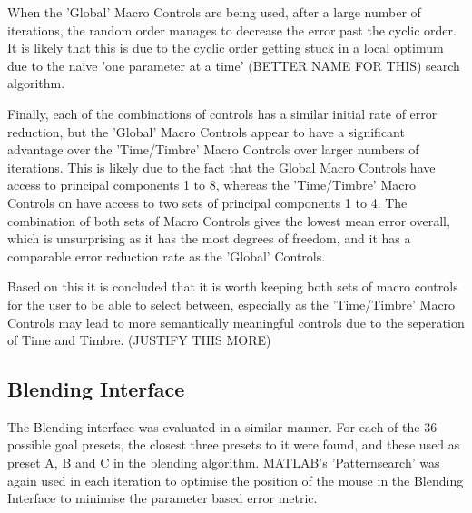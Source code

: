 \documentclass[11pt, oneside]{report}   	%
\begin{document}
When the 'Global' Macro Controls are being used, after a large number of iterations, the random order manages to decrease the error past the cyclic order. It is likely that this is due to the cyclic order getting stuck in a local optimum due to the naive 'one parameter at a time' (BETTER NAME FOR THIS) search algorithm.

Finally, each of the combinations of controls has a similar initial rate of error reduction, but the 'Global' Macro Controls appear to have a significant advantage over the 'Time/Timbre' Macro Controls over larger numbers of iterations. This is likely due to the fact that the Global Macro Controls have access to principal components 1 to 8, whereas the 'Time/Timbre' Macro Controls on have access to two sets of principal components 1 to 4. The combination of both sets of Macro Controls gives the lowest mean error overall, which is unsurprising as it has the most degrees of freedom, and it has a comparable error reduction rate as the 'Global' Controls.

Based on this it is concluded that it is worth keeping both sets of macro controls for the user to be able to select between, especially as the 'Time/Timbre' Macro Controls may lead to more semantically meaningful controls due to the seperation of Time and Timbre. (JUSTIFY THIS MORE)

\subsection{Blending Interface} \label{sec:BlendingEval}
The Blending interface was evaluated in a similar manner. For each of the 36 possible goal presets, the closest three presets to it were found, and these used as preset A, B and C in the blending algorithm. MATLAB's 'Patternsearch' was again used in each iteration to optimise the position of the mouse in the Blending Interface to minimise the parameter based error metric. 
\end{document}
